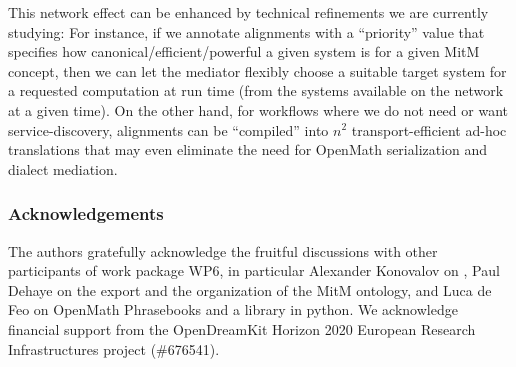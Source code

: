 This network effect can be enhanced by technical refinements we are currently studying:
For instance, if we annotate alignments with a ``priority'' value that specifies how
canonical/efficient/powerful a given system is for a given MitM concept, then we can let
the \MMT mediator flexibly choose a suitable target system for a requested computation at
run time (from the systems available on the \SCSCP network at a given time). On the other
hand, for workflows where we do not need or want service-discovery, alignments can be
``compiled'' into $n^2$ transport-efficient ad-hoc translations that may even eliminate
the need for OpenMath serialization and dialect mediation.

\subsubsection*{Acknowledgements}
The authors gratefully acknowledge the fruitful discussions with other participants of
work package WP6, in particular Alexander Konovalov on \SCSCP, Paul Dehaye on the \Sage
export and the organization of the MitM ontology, and Luca de Feo on OpenMath Phrasebooks
and a \SCSCP library in python.  We acknowledge financial support from the OpenDreamKit
Horizon 2020 European Research Infrastructures project (\#676541).


